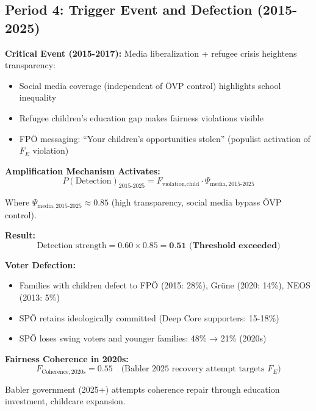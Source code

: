 \subsection{Period 4: Trigger Event and Defection (2015-2025)}

\textbf{Critical Event (2015-2017):} Media liberalization + refugee crisis heightens transparency:
\begin{itemize}[nosep]
\item Social media coverage (independent of ÖVP control) highlights school inequality
\item Refugee children's education gap makes fairness violations visible
\item FPÖ messaging: ``Your children's opportunities stolen'' (populist activation of $F_E$ violation)
\end{itemize}

\textbf{Amplification Mechanism Activates:}
\begin{equation}
P(\text{Detection})_{2015\text{-}2025} = F_{\text{violation},\text{child}} \cdot \Psi_{\text{media},2015\text{-}2025}
\end{equation}

Where $\Psi_{\text{media},2015\text{-}2025} \approx 0.85$ (high transparency, social media bypass ÖVP control).

\textbf{Result:}
\begin{equation}
\text{Detection strength} = 0.60 \times 0.85 = \textbf{0.51 (Threshold exceeded)}
\end{equation}

\textbf{Voter Defection:}
\begin{itemize}[nosep]
\item Families with children defect to FPÖ (2015: 28\%), Grüne (2020: 14\%), NEOS (2013: 5\%)
\item SPÖ retains ideologically committed (Deep Core supporters: 15-18\%)
\item SPÖ loses swing voters and younger families: 48\% → 21\% (2020s)
\end{itemize}

\textbf{Fairness Coherence in 2020s:}
\begin{equation}
F_{\text{Coherence}, 2020\text{s}} = 0.55 \quad \text{(Babler 2025 recovery attempt targets } F_E \text{)}
\end{equation}

Babler government (2025+) attempts coherence repair through education investment, childcare expansion.

